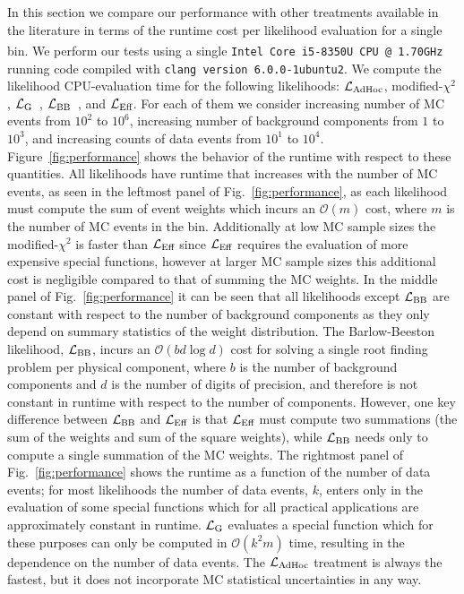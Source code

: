 \documentclass[a4paper, 11pt]{article}
\newcommand{\like}{\mathcal{L}}
\newcommand{\mcl}{\like_\textmd{Eff}}
\newcommand{\gl}{\like_\textmd{G}}
\newcommand{\adhoc}{\mathcal{L}_{\textmd{AdHoc}}}
\newcommand{\lbarlow}{\like_{\textmd{BB}}}
\begin{document}
In this section we compare our performance with other treatments available in the literature in terms of the runtime cost per likelihood evaluation for a single bin. We perform our tests using a single \texttt{Intel\textsuperscript{\textregistered} Core\texttrademark{} i5-8350U CPU @ 1.70GHz} running code compiled with \texttt{clang version 6.0.0-1ubuntu2}. We compute the likelihood CPU-evaluation time for the following likelihoods: $\adhoc$, modified-$\chi^2$, $\gl$~\cite{Glusenkamp:2017rlp}, $\lbarlow$~\cite{Barlow:1993dm}, and $\mcl$. For each of them we consider increasing number of MC events from $10^2$ to $10^6$, increasing number of background components from $1$ to $10^3$, and increasing counts of data events from $10^1$ to $10^4$. Figure~\ref{fig:performance} shows the behavior of the runtime with respect to these quantities. All likelihoods have runtime that increases with the number of MC events, as seen in the leftmost panel of Fig.~\ref{fig:performance}, as each likelihood must compute the sum of event weights which incurs an $\mathcal{O}(m)$ cost, where $m$ is the number of MC events in the bin. Additionally at low MC sample sizes the modified-$\chi^2$ is faster than $\mcl$ since $\mcl$ requires the evaluation of more expensive special functions, however at larger MC sample sizes this additional cost is negligible compared to that of summing the MC weights. In the middle panel of Fig.~\ref{fig:performance} it can be seen that all likelihoods except $\lbarlow$ are constant with respect to the number of background components as they only depend on summary statistics of the weight distribution. The Barlow-Beeston likelihood, $\lbarlow$, incurs an $\mathcal{O}(b d \log d)$ cost for solving a single root finding problem per physical component, where $b$ is the number of background components and $d$ is the number of digits of precision, and therefore is not constant in runtime with respect to the number of components. However, one key difference between $\lbarlow$ and $\mcl$ is that $\mcl$ must compute two summations (the sum of the weights and sum of the square weights), while $\lbarlow$ needs only to compute a single summation of the MC weights. The rightmost panel of Fig.~\ref{fig:performance} shows the runtime as a function of the number of data events; for most likelihoods the number of data events, $k$, enters only in the evaluation of some special functions which for all practical applications are approximately constant in runtime. $\gl$ evaluates a special function which for these purposes can only be computed in $\mathcal{O}(k^2 m)$ time, resulting in the dependence on the number of data events.
The $\adhoc$ treatment is always the fastest, but it does not incorporate MC statistical uncertainties in any way.  
\end{document}
